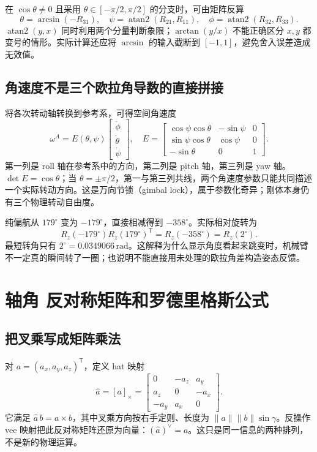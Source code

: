 在 $\cos\theta\ne0$ 且采用 $\theta\in[-\pi/2,\pi/2]$ 的分支时，可由矩阵反算
\begin{equation}
 \theta=\arcsin(-R_{31}),\quad
 \psi=\operatorname{atan2}(R_{21},R_{11}),\quad
 \phi=\operatorname{atan2}(R_{32},R_{33}).
\end{equation}
$\operatorname{atan2}(y,x)$ 同时利用两个分量判断象限；$\arctan(y/x)$ 不能正确区分 $x,y$ 都变号的情形。实际计算还应将 $\arcsin$ 的输入截断到 $[-1,1]$，避免舍入误差造成无效值。

\subsection{角速度不是三个欧拉角导数的直接拼接}
将各次转动轴转换到参考系，可得空间角速度
\begin{equation}
 \omega^A=E(\theta,\psi)
 \begin{bmatrix}\dot\phi\\\dot\theta\\\dot\psi\end{bmatrix},
 \quad
 E=\begin{bmatrix}
 \cos\psi\cos\theta&-\sin\psi&0\\
 \sin\psi\cos\theta&\cos\psi&0\\
 -\sin\theta&0&1
 \end{bmatrix}.
\end{equation}
第一列是 roll 轴在参考系中的方向，第二列是 pitch 轴，第三列是 yaw 轴。$\det E=\cos\theta$；当 $\theta=\pm\pi/2$，第一与第三列共线，两个角速度参数只能共同描述一个实际转动方向。这是万向节锁（gimbal lock），属于参数化奇异；刚体本身仍有三个物理转动自由度。

\begin{examplebox}
纯偏航从 $179^\circ$ 变为 $-179^\circ$，直接相减得到 $-358^\circ$。实际相对旋转为
\[
 R_z(-179^\circ)R_z(179^\circ)^\mathsf T
 =R_z(-358^\circ)=R_z(2^\circ).
\]
最短转角只有 $2^\circ=0.0349066\,\mathrm{rad}$。这解释为什么显示角度看起来跳变时，机械臂不一定真的瞬间转了一圈；也说明不能直接用未处理的欧拉角差构造姿态反馈。
\end{examplebox}

\section{轴角 反对称矩阵和罗德里格斯公式}
\subsection{把叉乘写成矩阵乘法}
对 $a=(a_x,a_y,a_z)^\mathsf T$，定义 hat 映射
\begin{equation}
 \widehat a=[a]_\times=
 \begin{bmatrix}0&-a_z&a_y\\a_z&0&-a_x\\-a_y&a_x&0\end{bmatrix}.
\end{equation}
它满足 $\widehat a\,b=a\times b$，其中叉乘方向按右手定则、长度为 $\|a\|\|b\|\sin\gamma$。反操作 vee 映射把此反对称矩阵还原为向量：$(\widehat a)^\vee=a$。这只是同一信息的两种排列，不是新的物理运算。

